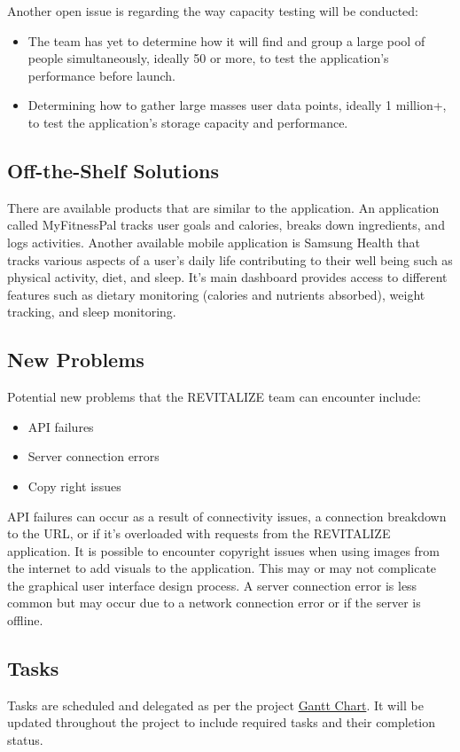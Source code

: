 \documentclass[12pt,letterpaper]{article}
\begin{document}
Another open issue is regarding the way capacity testing will be conducted:
\begin{itemize}
\item The team has yet to determine how it will find and group a large pool of people simultaneously, ideally 50 or more, to test the application's performance before launch.
\item Determining how to gather large masses user data points, ideally 1 million+, to test the application's storage capacity and performance.
\end{itemize}

\subsection{Off-the-Shelf Solutions}
There are available products that are similar to the application. An application called MyFitnessPal tracks user goals and calories, breaks down ingredients, and logs activities. Another available mobile application is Samsung Health that tracks various aspects of a user's daily life contributing to their well being such as physical activity, diet, and sleep. It's main dashboard provides access to different features such as dietary monitoring (calories and nutrients absorbed), weight tracking, and sleep monitoring. 

\subsection{New Problems}
Potential new problems that the REVITALIZE team can encounter include:
\begin{itemize}
\item API failures
\item Server connection errors
\item Copy right issues
\end{itemize}
API failures can occur as a result of connectivity issues, a connection breakdown to the URL, or if it's overloaded with requests from the REVITALIZE application. It is possible to encounter copyright issues when using images from the internet to add visuals to the application. This may or may not complicate the graphical user interface design process. A server connection error is less common but may occur due to a network connection error or if the server is offline.

\subsection{Tasks}
Tasks are scheduled and delegated as per the project \href{https://github.com/BillNguyen1999/REVITALIZE/blob/main/projectschedule/REVITALIZE.pdf}{\color{blue}Gantt Chart}. It will be updated throughout the project to include required tasks and their completion status.
\end{document}
